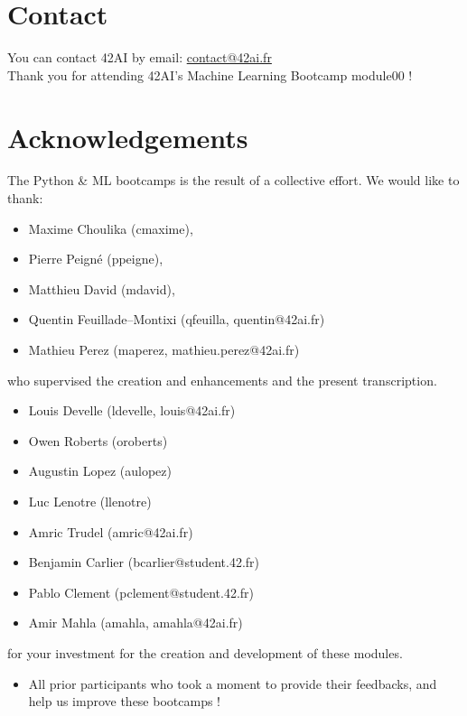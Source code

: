 \section*{Contact}
You can contact 42AI by email: \href{mailto:contact@42ai.fr}{contact@42ai.fr}\\
\newline
Thank you for attending 42AI's Machine Learning Bootcamp module00 !

\section*{Acknowledgements}
The Python \& ML bootcamps is the result of a collective effort. We would like to thank:
\begin{itemize}
  \item Maxime Choulika (cmaxime),
  \item Pierre Peigné (ppeigne),
  \item Matthieu David (mdavid),
  \item Quentin Feuillade--Montixi (qfeuilla, quentin@42ai.fr)
  \item Mathieu Perez (maperez, mathieu.perez@42ai.fr)
\end{itemize}
who supervised the creation and enhancements and the present transcription.

\begin{itemize}
  \item Louis Develle (ldevelle, louis@42ai.fr)
  \item Owen Roberts (oroberts)
  \item Augustin Lopez (aulopez)
  \item Luc Lenotre (llenotre)
  \item Amric Trudel (amric@42ai.fr)
  \item Benjamin Carlier (bcarlier@student.42.fr)
  \item Pablo Clement (pclement@student.42.fr)
  \item Amir Mahla (amahla, amahla@42ai.fr)
\end{itemize}
for your investment for the creation and development of these modules.

\begin{itemize}
    \item All prior participants who took a moment to provide their feedbacks, and help us improve these bootcamps !
  \end{itemize}

\vfill
\doclicenseThis

